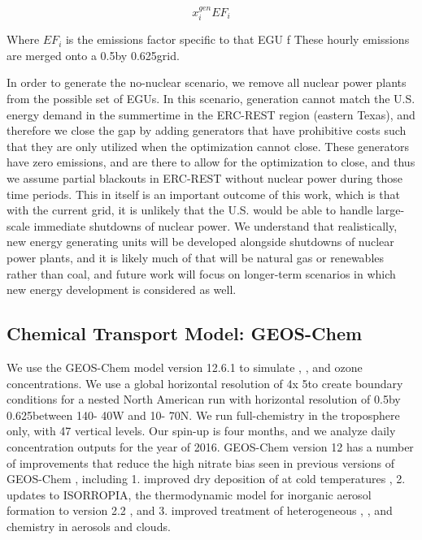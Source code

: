 \documentclass[12]{article}
\begin{document}
\begin{equation}
    x^{gen}_{i}EF_i
\end{equation}

Where $EF_i$ is the emissions factor specific to that EGU f
These hourly emissions are merged onto a 0.5\degree by 0.625\degree grid. 

In order to generate the no-nuclear scenario, we remove all nuclear power plants from the possible set of EGUs. In this scenario, generation cannot match the U.S. energy demand in the summertime in the ERC-REST region (eastern Texas), and therefore we close the gap by adding generators that have prohibitive costs such that they are only utilized when the optimization cannot close. These generators have zero emissions, and are there to allow for the optimization to close, and thus we assume partial blackouts in ERC-REST  without nuclear power during those time periods. This in itself is an important outcome of this work, which is that with the current grid, it is unlikely that the U.S. would be able to handle large-scale immediate shutdowns of nuclear power. We understand that realistically, new energy generating units will be developed alongside shutdowns of nuclear power plants, and it is likely much of that will be natural gas or renewables rather than coal, and future work will focus on longer-term scenarios in which new energy development is considered as well.

\subsection{Chemical Transport Model: GEOS-Chem}
We use the GEOS-Chem model \citep{} version 12.6.1 \citep{noauthor_geos-chem_2019} to simulate , ,  and ozone concentrations. We use a global horizontal resolution of 4\degree x 5\degree to create boundary conditions for a nested North American run with horizontal resolution of 0.5\degree by 0.625\degree between 140\degree - 40\degree W and 10\degree - 70\degree N. We run full-chemistry in the troposphere only, with 47 vertical levels. Our spin-up is four months, and we analyze daily concentration outputs for the year of 2016. GEOS-Chem version 12 has a number of improvements that reduce the high nitrate bias seen in previous versions of GEOS-Chem \citep{walker_simulation_2012}, including 1. improved dry deposition of  at cold temperatures \citep{jaegle_nitrogen_2018}, 2. updates to ISORROPIA, the thermodynamic model for inorganic aerosol formation to version 2.2 \citep{fountoukis_isorropia_2007}, and 3. improved treatment of heterogeneous , , and  chemistry in aerosols and clouds.
\end{document}
